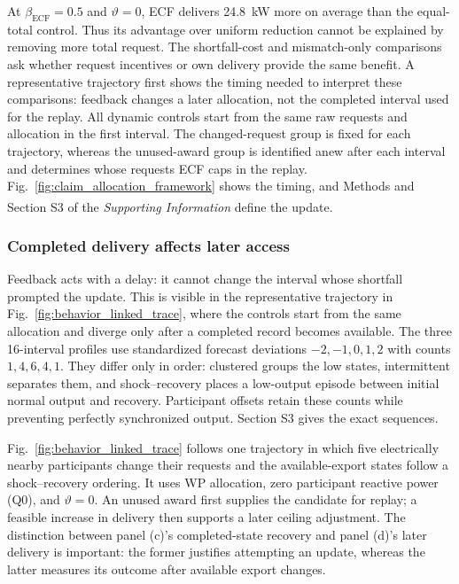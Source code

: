 \documentclass[twoside,twocolumn,9pt]{article}
\newcommand{\suppref}{\textit{Supporting Information}\textsuperscript{\dag}}
\begin{document}
At $\beta_{\mathrm{ECF}}=0.5$ and $\vartheta=0$, ECF delivers 24.8~kW more on
average than the equal-total control. Thus its advantage over uniform reduction
cannot be explained by removing more total request. The shortfall-cost and
mismatch-only comparisons ask whether request incentives or own delivery
provide the same benefit. A representative trajectory first shows the timing
needed to interpret these comparisons: feedback changes a later allocation,
not the completed interval used for the replay.
All dynamic controls start from the same raw requests and allocation in the
first interval. The changed-request group is
fixed for each trajectory, whereas the unused-award group is identified anew
after each interval and determines whose requests ECF caps in the replay.
Fig.~\ref{fig:claim_allocation_framework} shows the
timing, and Methods and Section S3 of the \suppref{} define the update.

\subsubsection{Completed delivery affects later access}

Feedback acts with a delay: it cannot change the interval whose shortfall
prompted the update. This is visible in the representative trajectory in
Fig.~\ref{fig:behavior_linked_trace}, where the controls start from the same
allocation and diverge only after a completed record becomes available. The three
16-interval profiles use standardized forecast deviations $-2,-1,0,1,2$
with counts $1,4,6,4,1$. They differ only in order: clustered groups the low
states, intermittent separates them, and shock--recovery places a low-output
episode between initial normal output and recovery. Participant offsets retain
these counts while preventing perfectly synchronized output. Section S3 gives
the exact sequences.

Fig.~\ref{fig:behavior_linked_trace} follows one trajectory in which five
electrically nearby participants change their requests and the available-export
states follow a shock--recovery ordering. It uses WP allocation, zero participant
reactive power (Q0), and $\vartheta=0$. An unused award first supplies the
candidate for replay; a feasible increase in delivery then supports a later
ceiling adjustment. The distinction between panel (c)'s completed-state recovery
and panel (d)'s later delivery is important: the former justifies attempting an
update, whereas the latter measures its outcome after available export changes.
\end{document}
